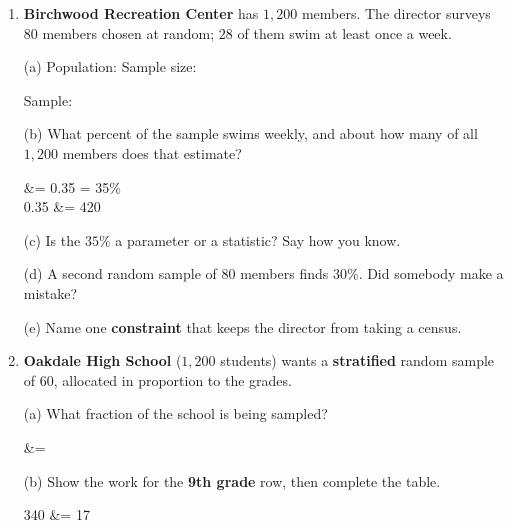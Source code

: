 \documentclass[10pt]{article}
\begin{document}
\begin{enumerate}[leftmargin=2.2em, itemsep=9pt, topsep=2pt]
(c) The data your question collects will be categorical or quantitative? \blank{3.0cm}

\boxguard[22]
\item \textbf{Birchwood Recreation Center} has $1{,}200$ members. The director surveys $80$
members chosen at random; $28$ of them swim at least once a week.

\vspace{2pt}
(a) Population: \blank{5.4cm} \quad Sample size: \blank{1.8cm}

\vspace{3pt}
Sample: \blank{9.0cm}

\vspace{3pt}
(b) What percent of the sample swims weekly, and about how many of all $1{,}200$ members
does that estimate?

\begin{work}
   &= 0.35 = 35\% \\
  0.35  &= 420 
\end{work}

(c) Is the $35\%$ a parameter or a statistic? Say how you know.

\par\writeline

(d) A second random sample of $80$ members finds $30\%$. Did somebody make a mistake?

\par\writeline

(e) Name one \textbf{constraint} that keeps the director from taking a census.

\par\writeline

\boxguard[26]
\item \textbf{Oakdale High School} ($1{,}200$ students) wants a \textbf{stratified} random
sample of $60$, allocated in proportion to the grades.

\vspace{2pt}
(a) What fraction of the school is being sampled?

\begin{work}
   &= 
\end{work}

(b) Show the work for the \textbf{9th grade} row, then complete the table.

\begin{work}
  340 \times {} &= 17 
\end{work}


\end{enumerate}
\end{document}
